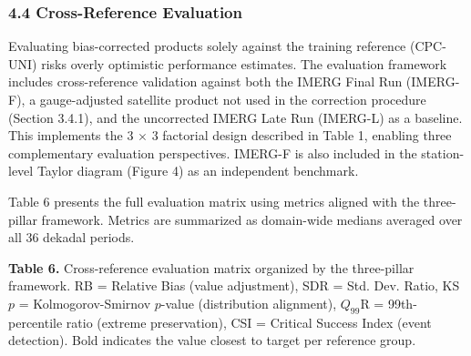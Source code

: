 \documentclass[
]{article}
\begin{document}
\subsubsection{4.4 Cross-Reference
Evaluation}\label{cross-reference-evaluation}

Evaluating bias-corrected products solely against the training reference
(CPC-UNI) risks overly optimistic performance estimates. The evaluation
framework includes cross-reference validation against both the IMERG
Final Run (IMERG-F), a gauge-adjusted satellite product not used in the
correction procedure (Section 3.4.1), and the uncorrected IMERG Late Run
(IMERG-L) as a baseline. This implements the 3 \(\times\) 3 factorial
design described in Table 1, enabling three complementary evaluation
perspectives. IMERG-F is also included in the station-level Taylor
diagram (Figure 4) as an independent benchmark.

Table 6 presents the full evaluation matrix using metrics aligned with
the three-pillar framework. Metrics are summarized as domain-wide
medians averaged over all 36 dekadal periods.

\textbf{Table 6.} Cross-reference evaluation matrix organized by the
three-pillar framework. RB = Relative Bias (value adjustment), SDR =
Std. Dev. Ratio, KS \(p\) = Kolmogorov-Smirnov \(p\)-value (distribution
alignment), \(Q_{99}\)R = 99th-percentile ratio (extreme preservation),
CSI = Critical Success Index (event detection). Bold indicates the value
closest to target per reference group.
\end{document}
